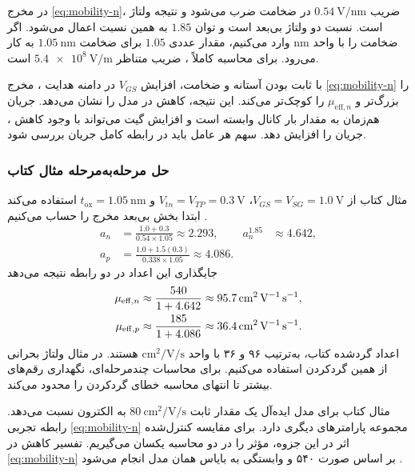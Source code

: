 در مخرج \eqref{eq:mobility-n}، ضریب
\(\qty{0.54}{\volt\per\nano\metre}\) در ضخامت ضرب می‌شود و نتیجه ولتاژ
است. نسبت دو ولتاژ بی‌بعد است و توان \(1.85\) به همین نسبت اعمال می‌شود.
اگر ضخامت را با واحد \(\unit{\nano\metre}\) وارد می‌کنیم، مقدار عددی
\(1.05\) برای ضخامت \(\qty{1.05}{\nano\metre}\) به کار می‌رود.
برای محاسبه کاملاً ، ضریب متناظر
\(\qty{5.4e8}{\volt\per\metre}\) است.

با ثابت بودن آستانه و ضخامت، افزایش \(V_{GS}\) در دامنه هدایت
، مخرج \eqref{eq:mobility-n} را بزرگ‌تر و \(\mu_{\mathrm{eff},n}\)
را کوچک‌تر می‌کند. این نتیجه، کاهش  در مدل را نشان می‌دهد.
جریان هم‌زمان به مقدار بار کانال وابسته است و افزایش گیت می‌تواند با وجود
کاهش ، جریان را افزایش دهد. سهم هر عامل باید در رابطه کامل
جریان بررسی شود.

\subsubsection*{حل مرحله‌به‌مرحله مثال  کتاب}
مثال کتاب از \(V_{GS}=V_{SG}=\qty{1.0}{\volt}\)،
\(V_{tn}=V_{TP}=\qty{0.3}{\volt}\) و
\(t_{\mathrm{ox}}=\qty{1.05}{\nano\metre}\) استفاده می‌کند
\cite[صفحه چاپی ۷۶]{weste}. ابتدا بخش بی‌بعد مخرج را حساب می‌کنیم
\begin{align*}
 a_n&=\frac{1.0+0.3}{0.54\times1.05}\approx2.293,
 &a_n^{1.85}&\approx4.642,\\
 a_p&=\frac{1.0+1.5(0.3)}{0.338\times1.05}\approx4.086.
\end{align*}
جایگذاری این اعداد در دو رابطه  نتیجه می‌دهد
\begin{align}
 \mu_{\mathrm{eff},n}
 &\approx\frac{540}{1+4.642}
 \approx\qty{95.7}{\centi\metre\squared\per\volt\per\second},\notag\\
 \mu_{\mathrm{eff},p}
 &\approx\frac{185}{1+4.086}
 \approx\qty{36.4}{\centi\metre\squared\per\volt\per\second}.
 \label{eq:mobility-example-results}
\end{align}
اعداد گرد‌شده کتاب، به‌ترتیب ۹۶ و ۳۶ با واحد
\(\unit{\centi\metre\squared\per\volt\per\second}\) هستند. در مثال
ولتاژ بحرانی از همین گردکردن استفاده می‌کنیم. برای محاسبات چندمرحله‌ای،
نگهداری رقم‌های بیشتر تا انتهای محاسبه خطای گردکردن را محدود می‌کند.

مثال  کتاب برای مدل ایده‌آل یک مقدار ثابت
\(\qty{80}{\centi\metre\squared\per\volt\per\second}\) به 
الکترون نسبت می‌دهد. رابطه تجربی \eqref{eq:mobility-n} مجموعه پارامترهای
دیگری دارد. برای مقایسه کنترل‌شده اثر  در این جزوه،
 مؤثر را در دو محاسبه یکسان می‌گیریم. تفسیر کاهش 
در \eqref{eq:mobility-n} بر اساس صورت ۵۴۰ و وابستگی به بایاس همان مدل
انجام می‌شود \cite[مثال‌های  و ]{weste}.

